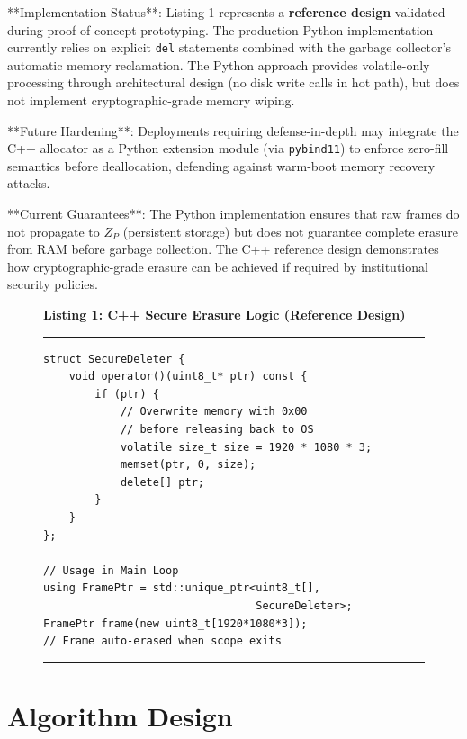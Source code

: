 \documentclass[conference]{IEEEtran}
\begin{document}
**Implementation Status**: Listing 1 represents a \textbf{reference design} validated during proof-of-concept prototyping. The production Python implementation currently relies on explicit \texttt{del} statements combined with the garbage collector's automatic memory reclamation. The Python approach provides volatile-only processing through architectural design (no disk write calls in hot path), but does not implement cryptographic-grade memory wiping.

**Future Hardening**: Deployments requiring defense-in-depth may integrate the C++ allocator as a Python extension module (via \texttt{pybind11}) to enforce zero-fill semantics before deallocation, defending against warm-boot memory recovery attacks.

**Current Guarantees**: The Python implementation ensures that raw frames do not propagate to $Z_P$ (persistent storage) but does not guarantee complete erasure from RAM before garbage collection. The C++ reference design demonstrates how cryptographic-grade erasure can be achieved if required by institutional security policies.

\begin{figure}[t!] 
\centering
\textbf{Listing 1: C++ Secure Erasure Logic (Reference Design)}
\hrule
\vspace{0.1cm}
\small
\begin{verbatim}
struct SecureDeleter {
    void operator()(uint8_t* ptr) const {
        if (ptr) {
            // Overwrite memory with 0x00
            // before releasing back to OS
            volatile size_t size = 1920 * 1080 * 3;
            memset(ptr, 0, size);
            delete[] ptr;
        }
    }
};

// Usage in Main Loop
using FramePtr = std::unique_ptr<uint8_t[], 
                                 SecureDeleter>;
FramePtr frame(new uint8_t[1920*1080*3]);
// Frame auto-erased when scope exits
\end{verbatim}
\hrule
\vspace{-0.2cm} 
\label{code:secure}
\end{figure}

\section{Algorithm Design}
\end{document}
